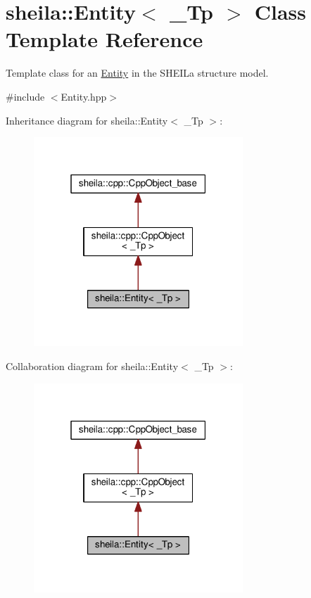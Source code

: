 \hypertarget{classsheila_1_1Entity}{}\section{sheila\+:\+:Entity$<$ \+\_\+\+Tp $>$ Class Template Reference}
\label{classsheila_1_1Entity}


Template class for an {\ttfamily \hyperlink{classsheila_1_1Entity}{Entity}} in the S\+H\+E\+I\+La structure model.  




{\ttfamily \#include $<$Entity.\+hpp$>$}



Inheritance diagram for sheila\+:\+:Entity$<$ \+\_\+\+Tp $>$\+:
\nopagebreak
\begin{figure}[H]
\begin{center}
\leavevmode
\includegraphics[width=223pt]{classsheila_1_1Entity__inherit__graph}
\end{center}
\end{figure}


Collaboration diagram for sheila\+:\+:Entity$<$ \+\_\+\+Tp $>$\+:
\nopagebreak
\begin{figure}[H]
\begin{center}
\leavevmode
\includegraphics[width=223pt]{classsheila_1_1Entity__coll__graph}
\end{center}
\end{figure}

